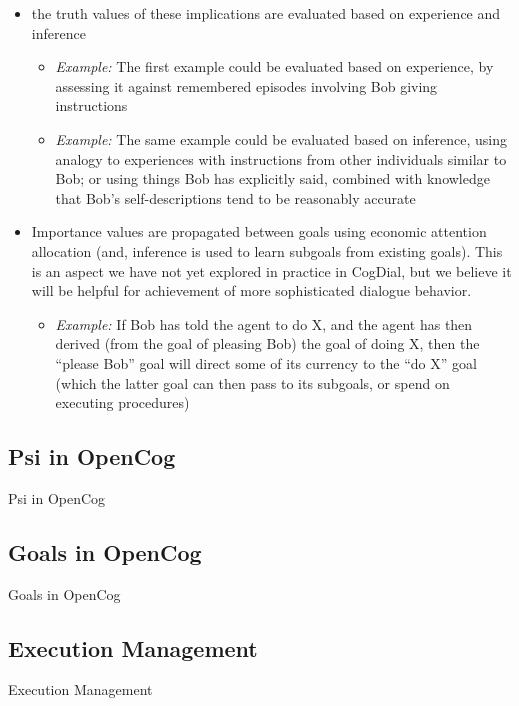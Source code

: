 \begin{itemize}
\item the truth values of these implications are evaluated based on experience and  inference
\begin{itemize}
\item {\it Example:} The first example could be evaluated based on experience, by assessing it against remembered episodes involving Bob giving instructions
\item {\it Example:} The same example could be evaluated based on inference, using analogy to experiences with instructions from other individuals similar to Bob; or using things Bob has explicitly said, combined with knowledge that Bob's self-descriptions tend to be reasonably accurate
\end{itemize}
\item Importance values are propagated between goals using economic attention allocation (and, inference is used to learn subgoals from existing goals).  This is an aspect we have not yet explored in practice in CogDial, but we believe it will be helpful for achievement of more sophisticated dialogue behavior.
\begin{itemize}
\item {\it Example:} If Bob has told the agent to do X, and the agent has then derived (from the goal of pleasing Bob) the goal of doing X, then the ``please Bob''  goal will direct some of its currency to the ``do X''  goal (which the latter goal can then pass to its subgoals, or spend on executing procedures)
\end{itemize}
\end{itemize}

\subsection{Psi in OpenCog}{Psi in OpenCog}

\subsection{Goals in OpenCog}{Goals in OpenCog}

\subsection{Execution Management}{Execution Management}
\label{Execution Management}

